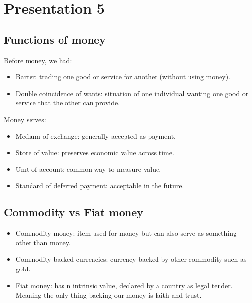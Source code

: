 \documentclass[openany]{book}
\begin{document}
\chapter{Presentation 5}
\section{Functions of money}
Before money, we had: 
\begin{itemize}
    \item Barter: trading one good or service for another (without using money).
    \item Double coincidence of wants: situation of one individual wanting one good or service that the other can provide. 
\end{itemize}
Money serves: 
\begin{itemize}
    \item Medium of exchange: generally accepted as payment.
    \item Store of value: preserves economic value across time.
    \item Unit of account: common way to measure value. 
    \item Standard of deferred payment: acceptable in the future.
\end{itemize}

\section{Commodity vs Fiat money}
\begin{itemize}
    \item Commodity money: item used for money but can also serve as something other than money. 
    \item Commodity-backed currencies: currency backed by other commodity such as gold. 
    \item Fiat money: has n intrinsic value, declared by a country as legal tender. Meaning the only thing backing our money is faith and trust. 
\end{itemize}
\end{document}
